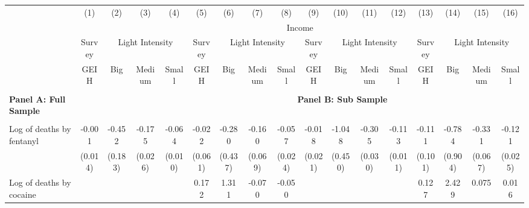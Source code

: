 \begin{tabular}{lcccccccccccccccc} \\ \hline 
                    &\multicolumn{1}{c}{(1)}         &\multicolumn{1}{c}{(2)}         &\multicolumn{1}{c}{(3)}         &\multicolumn{1}{c}{(4)}         &\multicolumn{1}{c}{(5)}         &\multicolumn{1}{c}{(6)}         &\multicolumn{1}{c}{(7)}         &\multicolumn{1}{c}{(8)}         &\multicolumn{1}{c}{(9)}         &\multicolumn{1}{c}{(10)}         &\multicolumn{1}{c}{(11)}         &\multicolumn{1}{c}{(12)}         &\multicolumn{1}{c}{(13)}         &\multicolumn{1}{c}{(14)}         &\multicolumn{1}{c}{(15)}         &\multicolumn{1}{c}{(16)}         \\
 & \multicolumn{16}{c}{Income} \\ \cline{2-5} \cline{6-9} \cline{10-13} \cline{14-17}  & Survey  &  \multicolumn{3}{c}{Light Intensity} & Survey & \multicolumn{3}{c}{Light Intensity} & Survey  &  \multicolumn{3}{c}{Light Intensity} & Survey & \multicolumn{3}{c}{Light Intensity} \\ \cline{3-5} \cline{7-9} \cline{11-13} \cline{15-17} & GEIH & Big & Medium & Small & GEIH & Big & Medium & Small & GEIH & Big & Medium & Small & GEIH & Big & Medium & Small \\ \hline & & & & & & & & & & & & & &  &  &  &  \\ \textbf{Panel A: Full Sample}& & & & & & & &  \multicolumn{5}{c}{\textbf{Panel B: Sub Sample}}  \\ & & & & & & & & & & & &  & & \\
Log of deaths by fentanyl&      -0.001         &      -0.452\sym{**} &      -0.175\sym{***}&      -0.064\sym{***}&      -0.022         &      -0.280         &      -0.160\sym{*}  &      -0.057\sym{*}  &      -0.018         &      -1.048\sym{*}  &      -0.305\sym{***}&      -0.113\sym{***}&      -0.111         &      -0.784         &      -0.331\sym{***}&      -0.121\sym{***}\\
                    &     (0.014)         &     (0.183)         &     (0.026)         &     (0.010)         &     (0.061)         &     (0.437)         &     (0.069)         &     (0.024)         &     (0.021)         &     (0.450)         &     (0.030)         &     (0.011)         &     (0.101)         &     (0.904)         &     (0.067)         &     (0.025)         \\
\addlinespace
Log of deaths by cocaine&                     &                     &                     &                     &       0.172         &       1.311         &      -0.070         &      -0.050         &                     &                     &                     &                     &       0.127         &       2.429\sym{*}  &       0.075         &       0.016         \\

\end{tabular}

